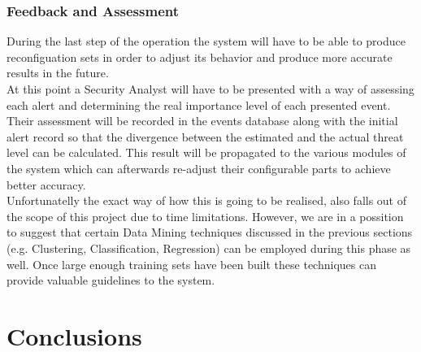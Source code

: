 \documentclass[12pt]{article}
\begin{document}

\subsubsection{Feedback and Assessment}
During the last step of the operation the system will have to be able to produce reconfiguation sets in order to adjust its behavior and produce more accurate results in the future.
\hfill \break\\
At this point a Security Analyst will have to be presented with a way of assessing each alert and  determining the real importance level of each presented event.
\hfill \break\\
Their assessment will be recorded in the events database along with the initial alert record so that the divergence between the estimated and the actual threat level can be calculated. This result will be propagated to the various modules of the system which can afterwards re-adjust their configurable parts to achieve better accuracy.
\hfill \break\\
Unfortunatelly the exact way of how this is going to be realised, also falls out of the scope of this project due to time limitations. However, we are in a possition to suggest that certain Data Mining techniques discussed in the previous sections (e.g. Clustering, Classification, Regression) can be employed during this phase as well. Once large enough training sets have been built these techniques can provide valuable guidelines to the system. 

\newpage
\section{Conclusions}
\end{document}
